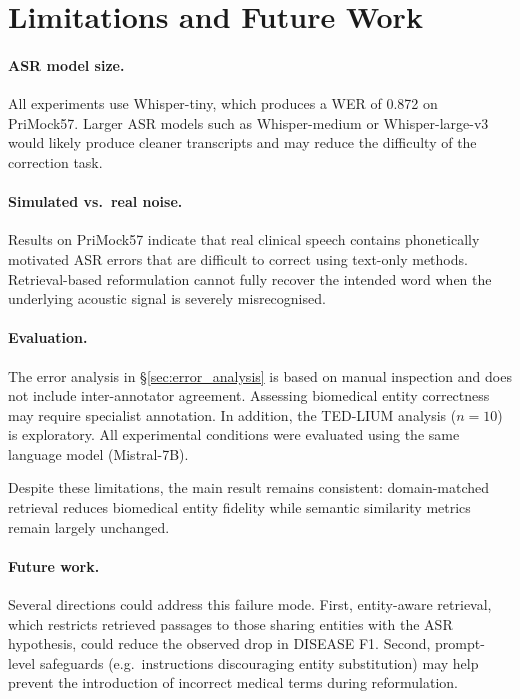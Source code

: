 \documentclass[11pt,a4paper,twocolumn]{article}
\begin{document}
\columnbreak
\section{Limitations and Future Work}
\label{sec:limits}

\paragraph{ASR model size.} All experiments use Whisper-tiny, which produces
a WER of 0.872 on PriMock57. Larger ASR models such as Whisper-medium or
Whisper-large-v3 would likely produce cleaner transcripts and may reduce the
difficulty of the correction task.

\paragraph{Simulated vs.\ real noise.} Results on PriMock57 indicate that
real clinical speech contains phonetically motivated ASR errors that are
difficult to correct using text-only methods. Retrieval-based reformulation
cannot fully recover the intended word when the underlying acoustic signal is
severely misrecognised.

\paragraph{Evaluation.} The error analysis in \S\ref{sec:error_analysis} is
based on manual inspection and does not include inter-annotator agreement.
Assessing biomedical entity correctness may require specialist annotation. In
addition, the TED-LIUM analysis ($n = 10$) is exploratory.
All experimental conditions were evaluated using the same language model
(Mistral-7B).

Despite these limitations, the main result remains consistent: domain-matched
retrieval reduces biomedical entity fidelity while semantic similarity metrics
remain largely unchanged.

\paragraph{Future work.} Several directions could address this failure mode.
First, entity-aware retrieval, which restricts retrieved passages to those
sharing entities with the ASR hypothesis, could reduce the observed drop in
DISEASE F1. Second, prompt-level safeguards (e.g.\ instructions discouraging
entity substitution) may help prevent the introduction of incorrect medical
terms during reformulation.
\end{document}
